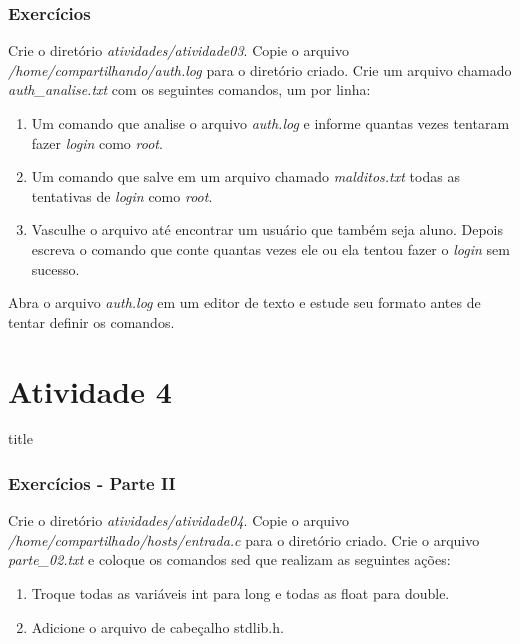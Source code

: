 \documentclass{beamer}
\begin{document}
   \begin{frame}
      \frametitle{Exercícios}
      Crie o diretório \textit{atividades/atividade03}. Copie o arquivo \textit{/home/compartilhando/auth.log} para o diretório criado. Crie um arquivo chamado \textit{auth\_analise.txt} com os seguintes comandos, um por linha:
      \begin{enumerate}
         \item Um comando que analise o arquivo \textit{auth.log} e informe quantas vezes tentaram fazer \textit{login} como \textit{root}.
	 \item Um comando que salve em um arquivo chamado \textit{malditos.txt} todas as tentativas de \textit{login} como \textit{root}.
	 \item Vasculhe o arquivo até encontrar um usuário que também seja aluno. Depois escreva o comando que conte quantas vezes ele ou ela tentou fazer o \textit{login} sem sucesso. 
      \end{enumerate}
      Abra o arquivo \textit{auth.log} em um editor de texto e estude seu formato antes de tentar definir os comandos.
   \end{frame}

\section{Atividade 4}
   \begin{frame}
      \begin{beamercolorbox}[sep=8pt,center,shadow=true,rounded=true]{title}
      \insertsectionhead\par%
      \end{beamercolorbox}
   \end{frame}

   \begin{frame}
      \frametitle{Exercícios - Parte II}
      Crie o diretório \textit{atividades/atividade04}. Copie o arquivo \textit{/home/compartilhado/hosts/entrada.c} para o diretório criado. Crie o arquivo \textit{parte\_02.txt} e coloque os comandos sed que realizam as seguintes ações:
      \begin{enumerate}
         \item Troque todas as variáveis int para long e todas as float para double.
	 \item Adicione o arquivo de cabeçalho stdlib.h. 
      \end{enumerate}
   \end{frame}
\end{document}
